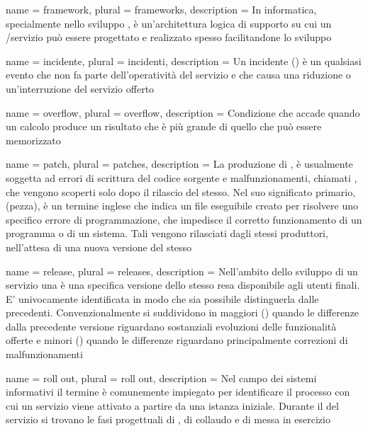 {
	name		= {framework},
	plural		= {frameworks},
	description = {In informatica, specialmente nello sviluppo , è un'architettura logica di supporto su cui un /servizio può essere progettato e realizzato spesso facilitandone lo sviluppo}
}

{
	name		= {incidente},
	plural		= {incidenti},
	description	= {Un incidente () è un qualsiasi evento che non fa parte dell'operatività  del servizio e che causa una riduzione o un'interruzione del servizio offerto}
}

{
	name		= {overflow},
	plural		= {overflow},
	description = {Condizione che accade quando un calcolo produce un risultato che è più grande di quello che può essere memorizzato}
}

{
	name		= {patch},
	plural		= {patches},
	description = {La produzione di , è usualmente soggetta ad errori di scrittura del codice sorgente e malfunzionamenti, chiamati , che vengono scoperti solo dopo il rilascio del  stesso. Nel suo significato primario,  (pezza), è un termine inglese che indica un file eseguibile creato per risolvere uno specifico errore di programmazione, che impedisce il corretto funzionamento di un programma o di un sistema. Tali  vengono rilasciati dagli stessi produttori, nell'attesa di una nuova versione del  stesso}
}

{
	name		= {release},
	plural		= {releases},
	description = {Nell'ambito dello sviluppo di un servizio una  è una specifica versione dello stesso resa disponibile agli utenti finali. E' univocamente identificata in modo che sia possibile distinguerla dalle precedenti. Convenzionalmente si suddividono in  maggiori () quando le differenze dalla precedente versione riguardano sostanziali evoluzioni delle funzionalità offerte e  minori () quando le differenze riguardano principalmente correzioni di malfunzionamenti}
}

{
	name		= {roll out},
	plural		= {roll out},
	description = {Nel campo dei sistemi informativi il termine  è comunemente impiegato per identificare il processo con cui un servizio viene attivato a partire da una istanza iniziale. Durante il  del servizio si trovano le fasi progettuali di , di collaudo e di messa in esercizio}
}

